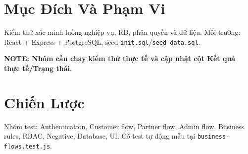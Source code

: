 \section{Mục Đích Và Phạm Vi}
Kiểm thử xác minh luồng nghiệp vụ, RB, phân quyền và dữ liệu. Môi trường: React + Express + PostgreSQL, seed \texttt{init.sql}/\texttt{seed-data.sql}.

\textbf{NOTE: Nhóm cần chạy kiểm thử thực tế và cập nhật cột Kết quả thực tế/Trạng thái.}

\section{Chiến Lược}
Nhóm test: Authentication, Customer flow, Partner flow, Admin flow, Business rules, RBAC, Negative, Database, UI. Có test tự động mẫu tại \texttt{business-flows.test.js}.

